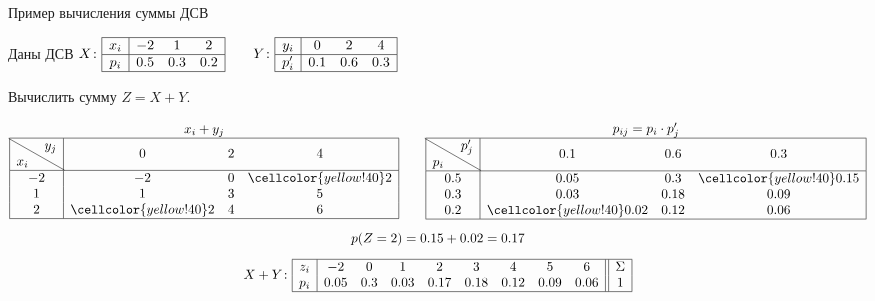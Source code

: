 \documentclass[unicode,11pt,notheorems,xcolor=table]{beamer}
\begin{document}
\begin{frame}{Пример вычисления суммы ДСВ}{}
    \begin{exampleblock}{}
        Даны ДСВ
        $X\colon \begin{array}{|c|ccc|}
        \hline
         x_i & -2 & 1& 2 \\
         \hline
         p_i & 0.5 & 0.3 & 0.2 \\
         \hline
        \end{array}
        \qquad
        Y\colon \begin{array}{|c|ccc|}
            \hline
             y_i & 0 & 2& 4 \\
             \hline
             p'_i & 0.1 & 0.6 & 0.3 \\
             \hline
            \end{array}
        $
        
        \smallskip
        Вычислить сумму $Z=X+Y$.
    \end{exampleblock}
    
    \vspace{-6mm}
    \begin{gather*}
        \begin{array}{|c|ccc|}
            \multicolumn{4}{c}{x_i+y_j}\\
            \hline
            \text{\diagbox{$x_i$}{$y_j$}} & 0 & 2 & 4 \\
            \hline
            -2 & -2 & 0 & \cellcolor{yellow!40} 2 \\
            1 &  1 & 3 & 5 \\
            2 & \cellcolor{yellow!40} 2 & 4 & 6 \\
            \hline
        \end{array}
        \qquad
        \begin{array}{|c|ccc|}
            \multicolumn{4}{c}{p_{ij}=p_i\cdot p'_j}\\
            \hline
            \text{\diagbox{$p_i$}{$p'_j$}} & 0.1 & 0.6 & 0.3 \\
            \hline
            0.5 & 0.05 & 0.3 & \cellcolor{yellow!40} 0.15 \\
            0.3 &  0.03 & 0.18 & 0.09 \\
            0.2 & \cellcolor{yellow!40} 0.02 & 0.12 & 0.06 \\
            \hline
        \end{array}
        \\[5pt]
        p(Z=2) = 0.15+0.02=0.17
        \\[5pt]
        X+ Y \colon\begin{array}{|c|cccccccc||c|}
            \hline
            z_i & -2 & 0 & 1 & 2 & 3 & 4 & 5& 6 & \Sigma\\
            p_i & 0.05 & 0.3 & 0.03 & 0.17 & 0.18 &  0.12 & 0.09 & 0.06 & 1\\
            \hline
        \end{array}
    \end{gather*}
\end{frame}
\end{document}
